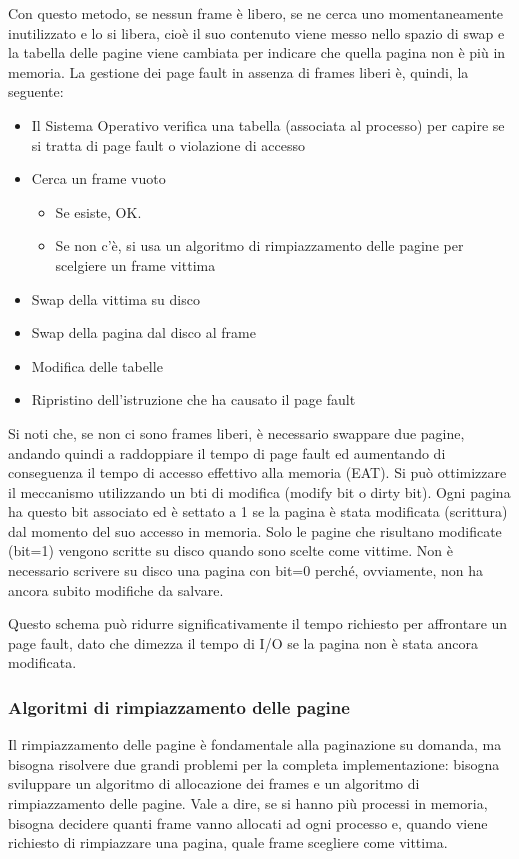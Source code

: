 \documentclass[a4paper]{article}
\begin{document}
Con questo metodo, se nessun frame è libero, se ne cerca uno momentaneamente inutilizzato e lo si libera, cioè il suo contenuto viene messo nello spazio di swap e la tabella delle pagine viene cambiata per indicare che quella pagina non è più in memoria. La gestione dei page fault in assenza di frames liberi è, quindi, la seguente:
\begin{itemize}
   \item Il Sistema Operativo verifica una tabella (associata al processo) per capire se si tratta di page fault o violazione di accesso
   \item Cerca un frame vuoto
         \begin{itemize}
            \item Se esiste, OK.
            \item Se non c'è, si usa un algoritmo di rimpiazzamento delle pagine per scelgiere un frame vittima
         \end{itemize}
   \item Swap della vittima su disco
   \item Swap della pagina dal disco al frame
   \item Modifica delle tabelle
   \item Ripristino dell'istruzione che ha causato il page fault
\end{itemize}
Si noti che, se non ci sono frames liberi, è necessario swappare due pagine, andando quindi a raddoppiare il tempo di page fault ed aumentando di conseguenza il tempo di accesso effettivo alla memoria (EAT).
Si può ottimizzare il meccanismo utilizzando un bti di modifica (modify bit o dirty bit). Ogni pagina ha questo bit associato ed è settato a 1 se la pagina è stata modificata (scrittura) dal momento del suo accesso in memoria. Solo le pagine che risultano modificate (bit=1) vengono scritte su disco quando sono scelte come vittime. Non è necessario scrivere su disco una pagina con bit=0 perché, ovviamente, non ha ancora subito modifiche da salvare.

Questo schema può ridurre significativamente il tempo richiesto per affrontare un page fault, dato che dimezza il tempo di I/O se la pagina non è stata ancora modificata.

\subsubsection{Algoritmi di rimpiazzamento delle pagine}
Il rimpiazzamento delle pagine è fondamentale alla paginazione su domanda, ma bisogna risolvere due grandi problemi per la completa implementazione: bisogna sviluppare un algoritmo di allocazione dei frames e un algoritmo di rimpiazzamento delle pagine. Vale a dire, se si hanno più processi in memoria, bisogna decidere quanti frame vanno allocati ad ogni processo e, quando viene richiesto di rimpiazzare una pagina, quale frame scegliere come vittima.
\end{document}
